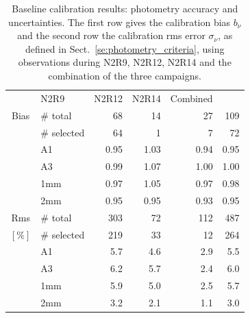 \begin{table}[!thbp]
  \begin{center}
    \caption[Baseline calibration results]{Baseline calibration results:
  photometry accuracy and uncertainties. The first row gives the
  calibration bias $b_{\nu}$ and the second row the calibration
  rms error $\sigma_{\nu}$, as defined in
  Sect.~\ref{se:photometry_criteria},
  using observations during N2R9, N2R12, N2R14 and the combination of
  the three campaigns.}
\label{tab:baseline-photometry}
\begin{tabular}{clrrrr}
  \hline\hline
  \noalign{\smallskip}
  \multicolumn{2}{c}{Characteristics} &  N2R9  & N2R12   &  N2R14 & Combined \\
  \noalign{\smallskip}
  \hline
  \noalign{\smallskip}
  Bias &  $\#$ total    &  68    &  14     &   27     &    109    \\
       &  $\#$ selected &  64    &   1     &   7      &     72    \\
       &  A1            &  0.95  &  1.03   &   0.94   &   0.95    \\
       &  A3            &  0.99  &  1.07   &   1.00   &   1.00    \\
       &  1mm           &  0.97  &  1.05   &   0.97   &   0.98    \\
       &  2mm           &  0.95  &  0.95   &   0.93   &   0.95    \\
  \hline
  \noalign{\smallskip}
  Rms  &  $\#$ total    &  303   &  72     &   112    &    487   \\
  $[\%]$ &  $\#$ selected &  219   &  33     &    12    &    264   \\
       &  A1            &  5.7   &  4.6    &   2.9    &    5.5   \\
       &  A3            &  6.2   &  5.7    &   2.4    &    6.0   \\
       &  1mm           &  5.9   &  5.0    &   2.5    &    5.7   \\
       &  2mm           &  3.2   &  2.1    &   1.1    &    3.0   \\  
\hline
\end{tabular}
\end{center}
\end{table}

